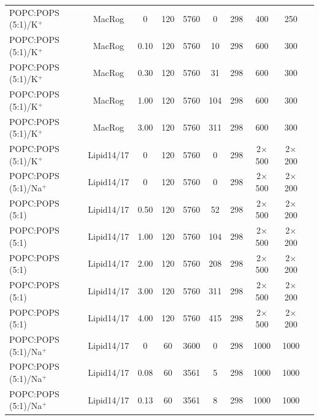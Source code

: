 \documentclass[aps,prl,superscriptaddress,twocolumn]{revtex4}
\begin{document}
\begin{table}[tb]
\begin{tabular}{lccccccccc}
POPC:POPS (5:1)/K$^{+}$  & MacRog \cite{maciejewski14}  & 0  & 120 & 5760  & 0  & 298  & 400 & 250 &  \cite{POPCpopsMACROG}\tabularnewline
POPC:POPS (5:1)/K$^{+}$  & MacRog \cite{maciejewski14}  & 0.10  & 120  & 5760  & 10  & 298  & 600  & 300  & \cite{POPCpopsMACROG} \tabularnewline
POPC:POPS (5:1)/K$^{+}$  & MacRog \cite{maciejewski14}  & 0.30  & 120  & 5760  & 31  & 298  & 600  & 300  & \cite{POPCpopsMACROG} \tabularnewline
POPC:POPS (5:1)/K$^{+}$  & MacRog \cite{maciejewski14}  & 1.00  & 120 & 5760  & 104  & 298  & 600  & 300  & \cite{POPCpopsMACROG} \tabularnewline
POPC:POPS (5:1)/K$^{+}$  & MacRog \cite{maciejewski14}  & 3.00  & 120 & 5760  & 311  & 298  & 600 & 300 & \cite{POPCpopsMACROG}\tabularnewline
\hline 
POPC:POPS (5:1)/K$^{+}$  & Lipid14/17 \cite{dickson14,gould18}  & 0  & 120  & 5760  & 0  & 298  & 2$\times$500  & 2$\times$200  & \cite{POPCpopsLIPID17withKCI} \tabularnewline
POPC:POPS (5:1)/Na$^{+}$  & Lipid14/17 \cite{dickson14,gould18}  & 0  & 120 & 5760  & 0  & 298  & 2$\times$500  & 2$\times$200  & \cite{POPCpopsLIPID17withNaCI} \tabularnewline
POPC:POPS (5:1)  & Lipid14/17 \cite{dickson14,gould18}  & 0.50  & 120 & 5760  & 52  & 298  & 2$\times$500  & 2$\times$200  & \cite{POPCpopsLIPID17withCaCl} \tabularnewline
POPC:POPS (5:1)  & Lipid14/17 \cite{dickson14,gould18}  & 1.00  & 120  & 5760  & 104  & 298  & 2$\times$500  & 2$\times$200  & \cite{POPCpopsLIPID17withCaCl} \tabularnewline
POPC:POPS (5:1)  & Lipid14/17 \cite{dickson14,gould18}  & 2.00  & 120  & 5760  & 208  & 298  & 2$\times$500  & 2$\times$200  & \cite{POPCpopsLIPID17withCaCl} \tabularnewline
POPC:POPS (5:1)  & Lipid14/17 \cite{dickson14,gould18}  & 3.00  & 120 & 5760  & 311  & 298  & 2$\times$500  & 2$\times$200  & \cite{POPCpopsLIPID17withCaCl} \tabularnewline
POPC:POPS (5:1)  & Lipid14/17 \cite{dickson14,gould18}  & 4.00  & 120  & 5760  & 415  & 298  & 2$\times$500  & 2$\times$200  & \cite{POPCpopsLIPID17withCaCl} \tabularnewline
POPC:POPS (5:1)/Na$^{+}$  & Lipid14/17 \cite{dickson14,gould18}  & 0  & 60 & 3600  & 0  & 298  & 1000  & 1000  & \cite{lipid17_cacl_series} \tabularnewline
POPC:POPS (5:1)/Na$^{+}$  & Lipid14/17 \cite{dickson14,gould18,smith94,dang06}  & 0.08  & 60  & 3561  & 5  & 298  & 1000  & 1000  & \cite{lipid17_cacl_series} \tabularnewline
POPC:POPS (5:1)/Na$^{+}$  & Lipid14/17 \cite{dickson14,gould18,smith94,dang06}  & 0.13  & 60  & 3561  & 8  & 298  & 1000  & 1000  & \cite{lipid17_cacl_series} \tabularnewline

\end{tabular}
\end{table}
\end{document}
